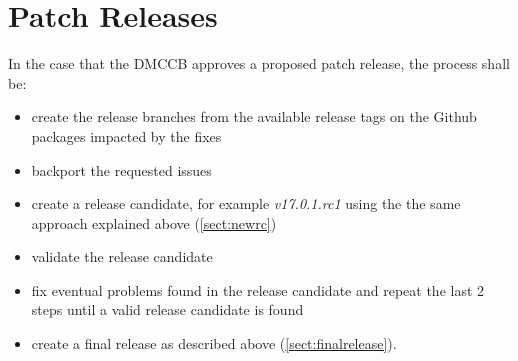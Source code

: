 \section{Patch Releases} \label{sect:patchreleases}

In the case that the DMCCB approves a proposed patch release, the process shall be:

\begin{itemize}
\item create the release branches from the available release tags on the Github packages impacted by the fixes
\item backport the requested issues
\item create a release candidate, for example \textit{v17.0.1.rc1} using the the same approach explained above (\ref{sect:newrc})
\item validate the release candidate
\item fix eventual problems found in the release candidate and repeat the last 2 steps until a valid release candidate is found
\item create a final release as described above (\ref{sect:finalrelease}).
\end{itemize}


